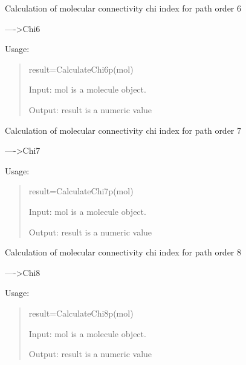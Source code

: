 \documentclass[letterpaper,10pt,english]{sphinxmanual}
\begin{document}

\begin{fulllineitems}
\label{reference/connectivity:connectivity.CalculateChi6p}
Calculation of molecular connectivity chi index for path order 6

----\textgreater{}Chi6

Usage:
\begin{quote}

result=CalculateChi6p(mol)

Input: mol is a molecule object.

Output: result is a numeric value
\end{quote}

\end{fulllineitems}


\begin{fulllineitems}
\label{reference/connectivity:connectivity.CalculateChi7p}
Calculation of molecular connectivity chi index for path order 7

----\textgreater{}Chi7

Usage:
\begin{quote}

result=CalculateChi7p(mol)

Input: mol is a molecule object.

Output: result is a numeric value
\end{quote}

\end{fulllineitems}


\begin{fulllineitems}
\label{reference/connectivity:connectivity.CalculateChi8p}
Calculation of molecular connectivity chi index for path order 8

----\textgreater{}Chi8

Usage:
\begin{quote}

result=CalculateChi8p(mol)

Input: mol is a molecule object.

Output: result is a numeric value
\end{quote}

\end{fulllineitems}
\end{document}
